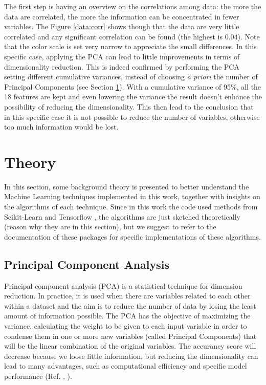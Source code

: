 \documentclass[english,notitlepage,reprint,nofootinbib]{revtex4-1}  %
\begin{document}
The first step is having an overview on the correlations among data: the more the data are correlated, the more the information can be concentrated in fewer variables. The Figure \ref{data:corr} shows though that the data are very little correlated and any significant correlation can be found (the highest is $0.04$). Note that the color scale is set very narrow to appreciate the small differences. In this specific case, applying the PCA can lead to little improvements in terms of dimensionality reduction. This is indeed confirmed by performing the PCA setting different cumulative variances, instead of choosing \textit{a priori} the number of Principal Components (see Section \ref{sec:theory}). With a cumulative variance of 95\%, all the 18 features are kept and even lowering the variance the result doesn't enhance the possibility of reducing the dimensionality. This then lead to the conclusion that in this specific case it is not possible to reduce the number of variables, otherwise too much information would be lost. 


\section{Theory} \label{sec:theory}
In this section, some background theory is presented to better understand the Machine Learning techniques implemented in this work, together with insights on the algorithms of each technique. Since in this work the code used methods from Scikit-Learn \cite{sk} and Tensorflow \cite{tf}, the algorithms are just sketched theoretically (reason why they are in this section), but we suggest to refer to the documentation of these packages for specific implementations of these algorithms.

\subsection{Principal Component Analysis} \label{sec:pc}

Principal component analysis (PCA) is a statistical technique for dimension reduction. In practice, it is used when there are variables related to each other within a dataset and the aim is to reduce the number of data by losing the least amount of information possible.
The PCA has the objective of maximizing the variance, calculating the weight to be given to each input variable in order to condense them in one or more new variables (called Principal Components) that will be the linear combination of the original variables.
The accurancy score will decrease because we loose little information, but reducing the dimensionality can lead to many advantages, such as computational efficiency and specific model performance (Ref. \cite{pc1}, \cite{pc}).
\end{document}

